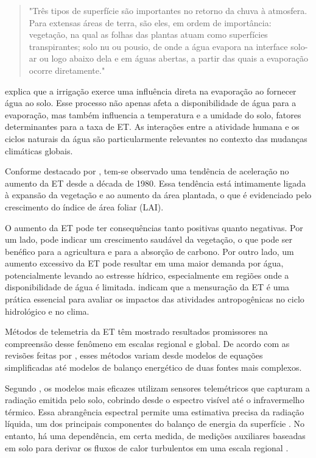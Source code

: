 \begin{quote}
  "Três tipos de superfície são importantes no retorno da chuva à atmosfera. Para extensas áreas de terra, são eles, em ordem de importância: vegetação, na qual as folhas das plantas atuam como superfícies transpirantes; solo nu ou pousio, de onde a água evapora na interface solo-ar ou logo abaixo dela e em águas abertas, a partir das quais a evaporação ocorre diretamente." \parencite[{p. 121}]{Penman_evapotranspiration1948}
\end{quote}

\textcite{Penman_evapotranspiration1948} explica que a irrigação exerce uma influência direta na evaporação ao fornecer água ao solo. Esse processo não apenas afeta a disponibilidade de água para a evaporação, mas também influencia a temperatura e a umidade do solo, fatores determinantes para a taxa de ET. As interações entre a atividade humana e os ciclos naturais da água são particularmente relevantes no contexto das mudanças climáticas globais. 

Conforme destacado por \textcite{yang_nature2023}, tem-se observado uma tendência de aceleração no aumento da ET desde a década de 1980. Essa tendência está intimamente ligada à expansão da vegetação e ao aumento da área plantada, o que é evidenciado pelo crescimento do índice de área foliar (LAI).

O aumento da ET pode ter consequências tanto positivas quanto negativas. Por um lado, pode indicar um crescimento saudável da vegetação, o que pode ser benéfico para a agricultura e para a absorção de carbono. Por outro lado, um aumento excessivo da ET pode resultar em uma maior demanda por água, potencialmente levando ao estresse hídrico, especialmente em regiões onde a disponibilidade de água é limitada. \textcite{yang_nature2023} indicam que a mensuração da ET é uma prática essencial para avaliar os impactos das atividades antropogênicas no ciclo hidrológico e no clima.

Métodos de telemetria da ET têm mostrado resultados promissores na compreensão desse fenômeno em escalas regional e global. De acordo com as revisões feitas por \textcite{Zhao_evapotranspiration_med2009, Zhang_evapotranspiration_med2016}, esses métodos variam desde modelos de equações simplificadas até modelos de balanço energético de duas fontes mais complexos. 

Segundo \textcite{Zhao_evapotranspiration_med2009}, os modelos mais eficazes utilizam sensores telemétricos que capturam a radiação emitida pelo solo, cobrindo desde o espectro visível até o infravermelho térmico. Essa abrangência espectral permite uma estimativa precisa da radiação líquida, um dos principais componentes do balanço de energia da superfície \parencite{Zhao_evapotranspiration_med2009}. No entanto, há uma dependência, em certa medida, de medições auxiliares baseadas em solo para derivar os fluxos de calor turbulentos em uma escala regional \parencite{Zhang_evapotranspiration_med2016}.

